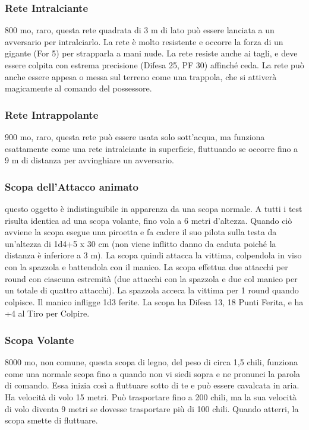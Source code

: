 \begin{multicols}{2}
	\subsubsection*{Rete Intralciante}
	800 mo, raro, questa rete quadrata di 3 m di lato può essere lanciata a un avversario per intralciarlo. La rete è molto resistente e occorre la forza di un gigante (For 5) per strapparla a mani nude. La rete resiste anche ai tagli, e deve essere colpita con estrema precisione (Difesa 25, PF 30) affinché ceda. La rete può anche essere appesa o messa sul terreno come una trappola, che si attiverà magicamente al comando del possessore.

	\subsubsection*{Rete Intrappolante}
	900 mo, raro, questa rete può essere usata solo sott'acqua, ma funziona esattamente come una rete intralciante in superficie, fluttuando se occorre fino a 9 m di distanza per avvinghiare un avversario.

	\subsubsection*{Scopa dell’Attacco animato}
	questo oggetto è indistinguibile in apparenza da una scopa normale. A tutti i test risulta identica ad una scopa volante, fino vola a 6 metri d'altezza. Quando ciò avviene la scopa esegue una piroetta e fa cadere il suo pilota sulla testa da un'altezza di 1d4+5 x 30 cm (non viene inflitto danno da caduta poiché la distanza è inferiore a 3 m). La scopa quindi attacca la vittima, colpendola in viso con la spazzola e battendola con il manico. La scopa effettua due attacchi per round con ciascuna estremità (due attacchi con la spazzola e due col manico per un totale di quattro attacchi). La spazzola acceca la vittima per 1 round quando colpisce. Il manico infligge 1d3 ferite. La scopa ha Difesa 13, 18 Punti Ferita, e ha +4 al Tiro per Colpire.

	\subsubsection*{Scopa Volante}
	8000 mo, non comune, questa scopa di legno, del peso di circa 1,5 chili, funziona come una normale scopa fino a quando non vi siedi sopra e ne pronunci la parola di comando. Essa inizia così a fluttuare sotto di te e può essere cavalcata in aria. Ha velocità di volo 15 metri. Può trasportare fino a 200 chili, ma la sua velocità di volo diventa 9 metri se dovesse trasportare più di 100 chili. Quando atterri, la scopa smette di fluttuare.


\end{multicols}
